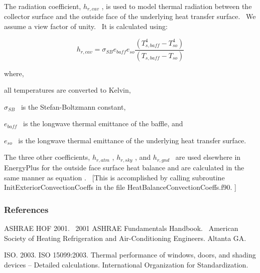 The radiation coefficient, \({h_{r,cav}}\) , is used to model thermal radiation between the collector surface and the outside face of the underlying heat transfer surface.~ We assume a view factor of unity.~ It is calculated using:

\begin{equation}
{h_{r,cav}} = {\sigma_{SB}}{e_{baff}}{e_{so}}\frac{{\left( {T_{s,baff}^4 - T_{so}^4} \right)}}{{\left( {{T_{s,baff}} - {T_{so}}} \right)}}
\end{equation}

where,

all temperatures are converted to Kelvin,

\({\sigma_{SB}}\) ~is the Stefan-Boltzmann constant,

\({e_{baff}}\) ~is the longwave thermal emittance of the baffle, and

\({e_{so}}\) ~is the longwave thermal emittance of the underlying heat transfer surface.

The three other coefficients, \({h_{r,atm}}\) , \({h_{r,sky}}\) , and \({h_{r,gnd}}\) ~are used elsewhere in EnergyPlus for the outside face surface heat balance and are calculated in the same manner as equation .~ {[}This is accomplished by calling subroutine InitExteriorConvectionCoeffs in the file HeatBalanceConvectionCoeffs.f90. {]}

\subsubsection{References}\label{references-023}

ASHRAE HOF 2001.~ 2001 ASHRAE Fundamentals Handbook.~ American Society of Heating Refrigeration and Air-Conditioning Engineers. Altanta GA.

ISO. 2003. ISO 15099:2003. Thermal performance of windows, doors, and shading devices -- Detailed calculations. International Organization for Standardization.
